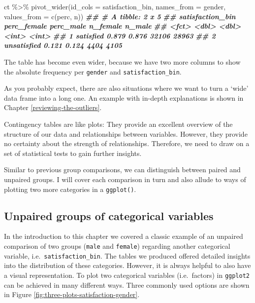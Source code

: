 \documentclass[
]{book}
\newenvironment{Shaded}{\begin{snugshade}}{\end{snugshade}}
\newcommand{\AttributeTok}[1]{\textcolor[rgb]{0.77,0.63,0.00}{#1}}
\newcommand{\DocumentationTok}[1]{\textcolor[rgb]{0.56,0.35,0.01}{\textbf{\textit{#1}}}}
\newcommand{\FunctionTok}[1]{\textcolor[rgb]{0.00,0.00,0.00}{#1}}
\newcommand{\NormalTok}[1]{#1}
\newcommand{\SpecialCharTok}[1]{\textcolor[rgb]{0.00,0.00,0.00}{#1}}
\begin{document}
\begin{Shaded}
\begin{Highlighting}[]
\NormalTok{ct }\SpecialCharTok{\%\textgreater{}\%} \FunctionTok{pivot\_wider}\NormalTok{(}\AttributeTok{id\_cols =}\NormalTok{ satisfaction\_bin,}
                   \AttributeTok{names\_from =}\NormalTok{ gender,}
                   \AttributeTok{values\_from =} \FunctionTok{c}\NormalTok{(perc, n))}
\DocumentationTok{\#\# \# A tibble: 2 x 5}
\DocumentationTok{\#\#   satisfaction\_bin perc\_female perc\_male n\_female n\_male}
\DocumentationTok{\#\#   \textless{}fct\textgreater{}                  \textless{}dbl\textgreater{}     \textless{}dbl\textgreater{}    \textless{}int\textgreater{}  \textless{}int\textgreater{}}
\DocumentationTok{\#\# 1 satisfied              0.879     0.876    32106  28963}
\DocumentationTok{\#\# 2 unsatisfied            0.121     0.124     4404   4105}
\end{Highlighting}
\end{Shaded}

The table has become even wider, because we have two more columns to show the absolute frequency per \texttt{gender} and \texttt{satisfaction\_bin}.

As you probably expect, there are also situations where we want to turn a `wide' data frame into a long one. An example with in-depth explanations is shown in Chapter \ref{reviewing-the-outliers}.

Contingency tables are like plots: They provide an excellent overview of the structure of our data and relationships between variables. However, they provide no certainty about the strength of relationships. Therefore, we need to draw on a set of statistical tests to gain further insights.

Similar to previous group comparisons, we can distinguish between paired and unpaired groups. I will cover each comparison in turn and also allude to ways of plotting two more categories in a \texttt{ggplot()}.

\hypertarget{unpaired-groups-categorical-variables}{%
\subsection{Unpaired groups of categorical variables}\label{unpaired-groups-categorical-variables}}

In the introduction to this chapter we covered a classic example of an unpaired comparison of two groups (\texttt{male} and \texttt{female}) regarding another categorical variable, i.e.~\texttt{satisfaction\_bin}. The tables we produced offered detailed insights into the distribution of these categories. However, it is always helpful to also have a visual representation. To plot two categorical variables (i.e.~factors) in \texttt{ggplot2} can be achieved in many different ways. Three commonly used options are shown in Figure \ref{fig:three-plots-satisfaction-gender}.
\end{document}
